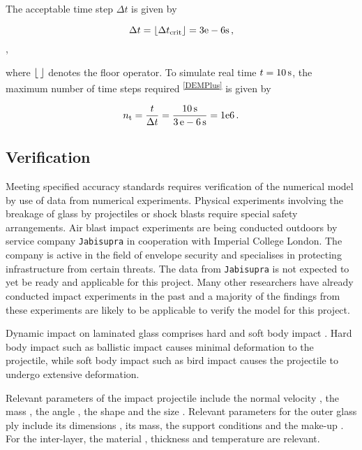 \documentclass[format=acmtog,12pt,screen=true,review=false,natbib=false,]{acmart}
\DeclarePairedDelimiter\floor{\lfloor}{\rfloor}
\begin{document}
The acceptable time step $\Delta t$ is given by

\begin{equation}
    \label{eq:deltat}
    \Delta t= \floor{\Delta t_{\rm{crit}}} = 3\rm{e}-6{\rm{s}}\,,
\end{equation},

where $\floor{\,}$ denotes the floor operator. To simulate real time $t=10\,{\rm{s}}$, the maximum number of time steps required \cite{Far19}\textsuperscript{\ref{DEMPlus}} is given by

\begin{equation}
    \label{eq:nt}
    n_{\rm{t}}=\frac{t}{\Delta t}=\frac{10\,{\rm{s}}}{3\,{\rm{e}}-6\,{\rm{s}}}=1{\rm{e}}6\,.
\end{equation}

\subsection{Verification}
\label{subsec:Verification}

Meeting specified accuracy standards \cite{Sto15} requires verification of the numerical model by use of data from numerical experiments. Physical experiments involving the breakage of glass by projectiles or shock blasts require special safety arrangements. Air blast impact experiments are being conducted outdoors by service company \texttt{Jabisupra} \cite{Jab16} in cooperation with Imperial College London. The company is active in the field of envelope security and specialises in protecting infrastructure from certain threats. The data from \texttt{Jabisupra} is not expected to yet be ready and applicable for this project. Many other researchers have already conducted impact experiments in the past and a majority of the findings from these experiments are likely to be applicable to verify the model for this project.

\bigbreak
Dynamic impact on laminated glass comprises hard and soft body impact \cite{Moh17}. Hard body impact such as ballistic impact \cite{Bra10} causes minimal deformation to the projectile, while soft body impact such as bird impact \cite{Moh17} causes the projectile to undergo extensive deformation.

\bigbreak
Relevant parameters of the impact projectile include the normal velocity \cite{Gra98, Kar14, Dar13, Wu14}, the mass \cite{Kar14, Dar13}, the angle \cite{Gra98, Kar14, Dar13}, the shape \cite{Dar13} and the size \cite{Wu14}. Relevant parameters for the outer glass ply include its dimensions \cite{Wan18}, its mass, the support conditions \cite{Wan18} and the make-up \cite{Wan18}. For the inter-layer, the material \cite{Moh18, Wan18, Mon04}, thickness \cite{Ji98, Kar14, Wan18} and temperature \cite{Moh18, Zha19} are relevant.
\end{document}
